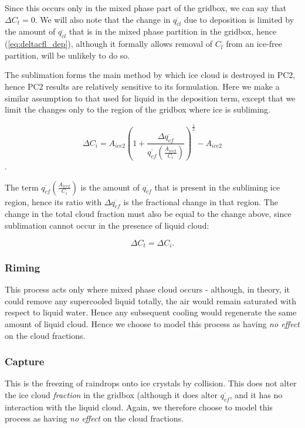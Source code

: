 \documentclass{UMDP_article}
\begin{document}
Since this occurs only in the mixed phase part of the gridbox, we can say
that $\Delta C_t = 0$. We will also note that the change in $\overline{q_{cl}}$
due to deposition is limited by the amount of $\overline{q_{cl}}$ that is in
the mixed phase partition in the gridbox, hence (\ref{eq:deltacfl_dep}),
although it formally allows removal of $C_l$ from an ice-free partition, will
be unlikely to do so.

The sublimation forms the main method by which ice cloud is destroyed in PC2,
hence PC2 results are relatively sensitive to its formulation. Here we
make a similar assumption to that used for liquid in the deposition term,
except that we limit the changes only to the region of the gridbox where
ice is subliming.

\begin{equation}
\Delta C_i = A_{ice2} ( 1 + \frac{\Delta \overline{q_{cf}} }
{  \overline{q_{cf}} (  \frac{A_{ice2}}{C_i}   )     }
 )^{\frac{1}{2}} - A_{ice2}
\label{eq:deltacfi_sub}
\end{equation}.

The term $\overline{q_{cf}} (  \frac{A_{ice2}}{C_i}   )$ is the amount of
$\overline{q_{cf}}$ that is present in the subliming ice region, hence its
ratio with $\Delta \overline{q_{cf}}$ is the fractional change in that region. The
change in the total cloud fraction must also be equal to the change above,
since sublimation cannot occur in the presence of liquid cloud:

\begin{equation}
\Delta C_t = \Delta C_i .
\label{eq:deltacft_sub}
\end{equation}

\subsubsection{Riming}
This process acts only where mixed phase cloud occurs - although, in theory,
it could remove any supercooled liquid totally, the air would remain
saturated with respect to liquid water. Hence any subsequent cooling would
regenerate the same amount of liquid cloud. Hence we choose to model this
process as having \textit{no effect} on the cloud fractions.

\subsubsection{Capture}
This is the freezing of raindrops onto ice crystals by collision. This does
not alter the ice cloud \textit{fraction} in the gridbox (although it does
alter $\overline{q_{cf}}$, and it has no interaction with the liquid cloud.
Again, we therefore choose to model this process as having \textit{no effect}
on the cloud fractions.
\end{document}
